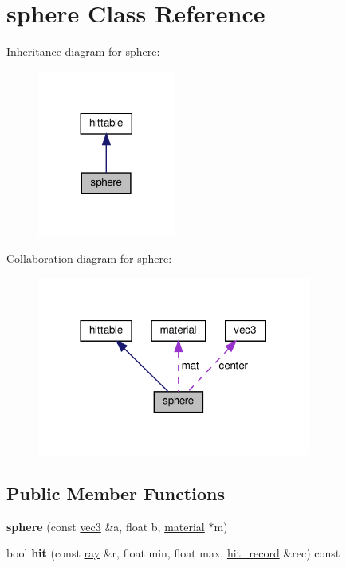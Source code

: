 \hypertarget{classsphere}{}\section{sphere Class Reference}
\label{classsphere}


Inheritance diagram for sphere\+:
\nopagebreak
\begin{figure}[H]
\begin{center}
\leavevmode
\includegraphics[width=128pt]{classsphere__inherit__graph}
\end{center}
\end{figure}


Collaboration diagram for sphere\+:
\nopagebreak
\begin{figure}[H]
\begin{center}
\leavevmode
\includegraphics[width=254pt]{classsphere__coll__graph}
\end{center}
\end{figure}
\subsection*{Public Member Functions}
\begin{DoxyCompactItemize}
\item 
\mbox{\label{classsphere_ab3f00cd2dc70110d320ffd73b165c0ba}} 
{\bfseries sphere} (const \hyperlink{classvec3}{vec3} \&a, float b, \hyperlink{classmaterial}{material} $\ast$m)
\item 
\mbox{\label{classsphere_a49d4617e15918e1dcaaf5156bb9b4252}} 
bool {\bfseries hit} (const \hyperlink{classray}{ray} \&r, float min, float max, \hyperlink{structhit__record}{hit\+\_\+record} \&rec) const
\end{DoxyCompactItemize}
